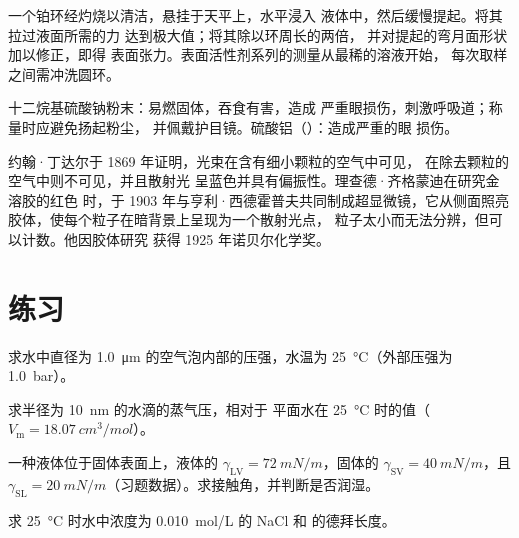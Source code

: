 \begin{inthelab}[杜诺伊环]
一个铂环经灼烧以清洁，悬挂于天平上，水平浸入
液体中，然后缓慢提起。将其拉过液面所需的力
达到极大值；将其除以环周长的两倍，
并对提起的弯月面形状加以修正，即得
表面张力。表面活性剂系列的测量从最稀的溶液开始，
每次取样之间需冲洗圆环。
\end{inthelab}

\begin{safety}{}
十二烷基硫酸钠粉末：易燃固体，吞食有害，造成
严重眼损伤，刺激呼吸道；称量时应避免扬起粉尘，
并佩戴护目镜。硫酸铝（）：造成严重的眼
损伤。
\end{safety}

\begin{history}[丁达尔与超显微镜]
约翰·丁达尔于 1869 年证明，光束在含有细小颗粒的空气中可见，
在除去颗粒的空气中则不可见，并且散射光
呈蓝色并具有偏振性。理查德·齐格蒙迪在研究金溶胶的红色
时，于 1903 年与亨利·西德霍普夫共同制成超显微镜，它从侧面照亮
胶体，使每个粒子在暗背景上呈现为一个散射光点，
粒子太小而无法分辨，但可以计数。他因胶体研究
获得 1925 年诺贝尔化学奖。
\end{history}

\section{练习}

\begin{exercise}[$\star$]\label{exo:b3:colloids:1}
求水中直径为 \qty{1.0}{\micro m} 的空气泡内部的压强，水温为
\qty{25}{\celsius}（外部压强为 \qty{1.0}{bar}）。
\end{exercise}

\begin{exercise}[$\star$]\label{exo:b3:colloids:2}
求半径为 \qty{10}{nm} 的水滴的蒸气压，相对于
平面水在 \qty{25}{\celsius} 时的值（$V_{\mathrm m} = \qty{18.07}{cm^3/mol}$）。
\end{exercise}

\begin{exercise}[$\star$]\label{exo:b3:colloids:3}
一种液体位于固体表面上，液体的 $\gamma_{\mathrm{LV}} = \qty{72}{mN/m}$，固体的 $\gamma_{\mathrm{SV}} = \qty{40}{mN/m}$，且 $\gamma_{\mathrm{SL}} =
\qty{20}{mN/m}$（习题数据）。求接触角，并判断是否润湿。
\end{exercise}

\begin{exercise}[$\star$]\label{exo:b3:colloids:4}
求 \qty{25}{\celsius} 时水中浓度为 \qty{0.010}{mol/L} 的 NaCl 和
 的德拜长度。
\end{exercise}

